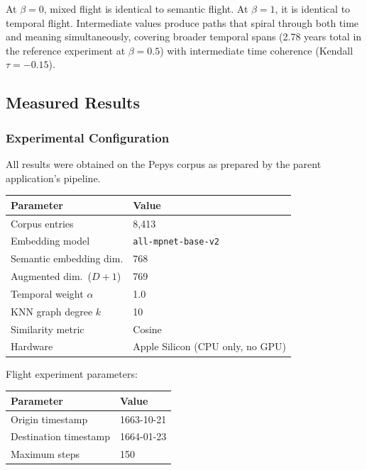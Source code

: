 \documentclass[12pt,letterpaper]{article}
\begin{document}
At $\beta = 0$, mixed flight is identical to semantic flight. At $\beta = 1$,
it is identical to temporal flight. Intermediate values produce paths that
spiral through both time and meaning simultaneously, covering broader temporal
spans (2.78 years total in the reference experiment at $\beta = 0.5$) with
intermediate time coherence (Kendall $\tau = -0.15$).

\subsection{Measured Results}
\label{sec:results}

\subsubsection{Experimental Configuration}

All results were obtained on the Pepys corpus as prepared by the parent
application's pipeline.

\begin{center}
\begin{tabular}{ll}
  \toprule
  \textbf{Parameter} & \textbf{Value} \\
  \midrule
  Corpus entries             & 8,413 \\
  Embedding model            & \texttt{all-mpnet-base-v2} \\
  Semantic embedding dim.    & 768 \\
  Augmented dim.\ ($D+1$)    & 769 \\
  Temporal weight $\alpha$   & 1.0 \\
  KNN graph degree $k$       & 10 \\
  Similarity metric          & Cosine \\
  Hardware                   & Apple Silicon (CPU only, no GPU) \\
  \bottomrule
\end{tabular}
\end{center}

\vspace{1em}

Flight experiment parameters:

\begin{center}
\begin{tabular}{ll}
  \toprule
  \textbf{Parameter} & \textbf{Value} \\
  \midrule
  Origin timestamp     & 1663-10-21 \\
  Destination timestamp & 1664-01-23 \\
  Maximum steps        & 150 \\
  \bottomrule
\end{tabular}
\end{center}
\end{document}
